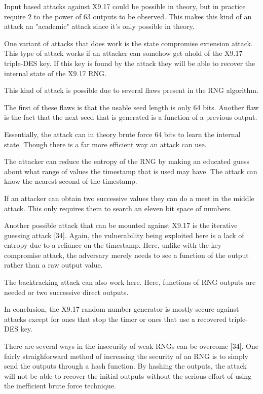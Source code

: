 \documentclass{article}
\begin{document}
    Input based attacks against X9.17 could be possible in theory, but in practice
    require 2 to the power of 63 outputs to be observed. This makes this kind
    of an attack an "academic" attack since it's only possible in theory.

    One variant of attacks that does work is the state compromise extension attack.
    This type of attack works if an attacker can somehow get ahold of the X9.17
    triple-DES key. If this key is found by the attack they will be able
    to recover the internal state of the X9.17 RNG.

    This kind of attack is possible due to several flaws present in the RNG algorithm.

    The first of these flaws is that the usable seed length is only 64 bits.
    Another flaw is the fact that the next seed that is generated is a function
    of a previous output.

    Essentially, the attack can in theory brute force 64 bits to learn the internal state.
    Though there is a far more efficient way an attack can use.

    The attacker can reduce the entropy of the RNG by making an educated guess
    about what range of values the timestamp that is used may have.
    The attack can know the nearest second of the timestamp.

    If an attacker can obtain two successive values they can do a meet in the middle attack.
    This only requires them to search an eleven bit space of numbers.

    Another possible attack that can be mounted against X9.17 is the iterative guessing
    attack [34]. Again, the vulnerability being exploited here is a lack of entropy
    due to a reliance on the timestamp. Here, unlike with the key compromise attack,
    the adversary merely needs to see a function of the output rather than a raw output
    value.

    The backtracking attack can also work here. Here, functions of RNG outputs
    are needed or two successive direct outputs.

    In conclusion, the X9.17 random number generator is mostly secure against
    attacks except for ones that stop the timer or ones that use a recovered triple-DES
    key.


    There are several ways in the insecurity of weak RNGs can be overcome [34].
    One fairly straighforward method of increasing the security of an RNG
    is to simply send the outputs through a hash function. By hashing the outputs,
    the attack will not be able to recover the initial outputs without the
    serious effort of using the inefficient brute force technique.
\end{document}
